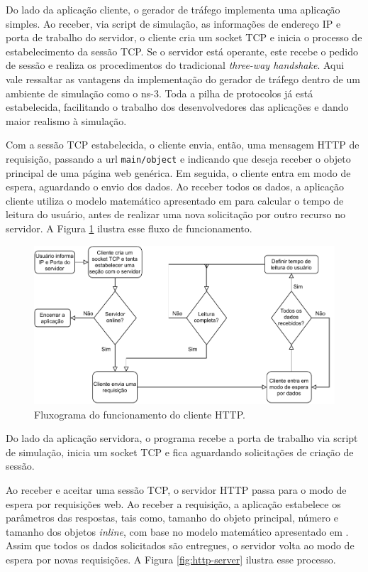 Do lado da aplicação cliente, o gerador de tráfego implementa uma aplicação simples. Ao receber, via script de simulação, as informações de endereço IP e porta de trabalho do servidor, o cliente cria um socket TCP e inicia o processo de estabelecimento da sessão TCP. Se o servidor está operante, este recebe o pedido de sessão e realiza os procedimentos do tradicional \textit{three-way handshake}. Aqui vale ressaltar as vantagens da implementação do gerador de tráfego dentro de um ambiente de simulação como o ns-3. Toda a pilha de protocolos já está estabelecida, facilitando o trabalho dos desenvolvedores das aplicações e dando maior realismo à simulação.

Com a sessão TCP estabelecida, o cliente envia, então, uma mensagem HTTP de requisição, passando a url \verb|main/object| e indicando que deseja receber o objeto principal de uma página web genérica. Em seguida, o cliente entra em modo de espera, aguardando o envio dos dados. Ao receber todos os dados, a aplicação cliente utiliza o modelo matemático apresentado em \cite{Pries2012} para calcular o tempo de leitura do usuário, antes de realizar uma nova solicitação por outro recurso no servidor. A Figura \ref{fig:http-client} ilustra esse fluxo de funcionamento.

\begin{figure}
	\centering
	\includegraphics[scale=0.75]{textuais/http-client.pdf}
	\caption[Fluxograma do funcionamento do cliente HTTP.]{Fluxograma do funcionamento do cliente HTTP.
		\label{fig:http-client}}
\end{figure}

Do lado da aplicação servidora, o programa recebe a porta de trabalho via script de simulação, inicia um socket TCP e fica aguardando solicitações de criação de sessão.

Ao receber e aceitar uma sessão TCP, o servidor HTTP passa para o modo de espera por requisições web. Ao receber a requisição, a aplicação estabelece os parâmetros das respostas, tais como, tamanho do objeto principal, número e tamanho dos objetos \textit{inline}, com base no modelo matemático apresentado em \cite{Pries2012}. Assim que todos os dados solicitados são entregues, o servidor volta ao modo de espera por novas requisições. A Figura \ref{fig:http-server} ilustra esse processo. 

